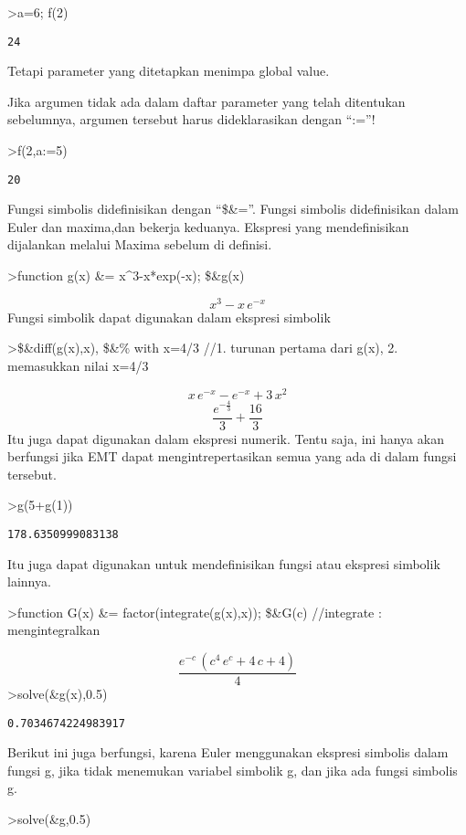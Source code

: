 \documentclass[
]{book}
\begin{document}
\textgreater a=6; f(2)

\begin{verbatim}
24
\end{verbatim}

Tetapi parameter yang ditetapkan menimpa global value.

Jika argumen tidak ada dalam daftar parameter yang telah ditentukan sebelumnya, argumen tersebut harus dideklarasikan dengan ``:=''!

\textgreater f(2,a:=5)

\begin{verbatim}
20
\end{verbatim}

Fungsi simbolis didefinisikan dengan ``\$\&=''. Fungsi simbolis didefinisikan dalam Euler dan maxima,dan bekerja keduanya. Ekspresi yang mendefinisikan dijalankan melalui Maxima sebelum di definisi.

\textgreater function g(x) \&= x\^{}3-x*exp(-x); \$\&g(x)

\[x^3-x\,e^ {- x }\]Fungsi simbolik dapat digunakan dalam ekspresi simbolik

\textgreater\$\&diff(g(x),x), \$\&\% with x=4/3 //1. turunan pertama dari g(x), 2. memasukkan nilai x=4/3

\[x\,e^ {- x }-e^ {- x }+3\,x^2\]\[\frac{e^ {- \frac{4}{3} }}{3}+\frac{16}{3}\]Itu juga dapat digunakan dalam ekspresi numerik. Tentu saja, ini hanya akan berfungsi jika EMT dapat mengintrepertasikan semua yang ada di dalam fungsi tersebut.

\textgreater g(5+g(1))

\begin{verbatim}
178.6350999083138
\end{verbatim}

Itu juga dapat digunakan untuk mendefinisikan fungsi atau ekspresi simbolik lainnya.

\textgreater function G(x) \&= factor(integrate(g(x),x)); \$\&G(c) //integrate : mengintegralkan

\[\frac{e^ {- c }\,\left(c^4\,e^{c}+4\,c+4\right)}{4}\]\textgreater solve(\&g(x),0.5)

\begin{verbatim}
0.7034674224983917
\end{verbatim}

Berikut ini juga berfungsi, karena Euler menggunakan ekspresi simbolis dalam fungsi g, jika tidak menemukan variabel simbolik g, dan jika ada fungsi simbolis g.

\textgreater solve(\&g,0.5)
\end{document}
